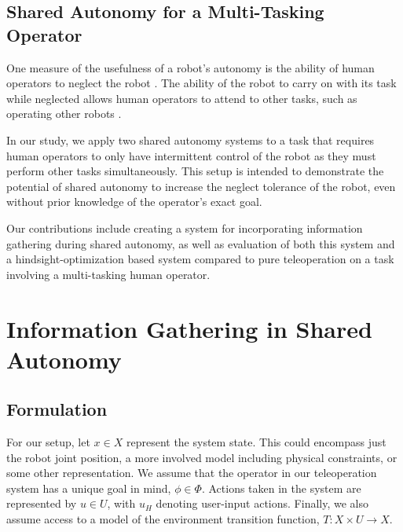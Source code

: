 \documentclass[conference]{IEEEtran}
\begin{document}
\subsection{Shared Autonomy for a Multi-Tasking Operator}
One measure of the usefulness of a robot's autonomy is the ability of human operators to neglect the robot \cite{crandall2002characterizing, olsen2003metrics}. The ability of the robot to carry on with its task while neglected allows human operators to attend to other tasks, such as operating other robots \cite{crandall2005validating, cummings2008predicting}.

In our study, we apply two shared autonomy systems to a task that requires human operators to only have intermittent control of the robot as they must perform other tasks simultaneously. This setup is intended to demonstrate the potential of shared autonomy to increase the neglect tolerance of the robot, even without prior knowledge of the operator's exact goal.

Our contributions include creating a system for incorporating information gathering during shared autonomy, as well as evaluation of both this system and a hindsight-optimization based system compared to pure teleoperation on a task involving a multi-tasking human operator.

\section{Information Gathering in Shared Autonomy}
\subsection{Formulation}

For our setup, let $ x \in X $ represent the system state. This could encompass just the robot joint position, a more involved model including physical constraints, or some other representation. We assume that the operator in our teleoperation system has a unique goal in mind, $\phi \in \Phi$. Actions taken in the system are represented by $ u \in U $, with $u_H$ denoting user-input actions. Finally, we also assume access to a model of the environment transition function, $T: X \times U \rightarrow X$.
\end{document}
